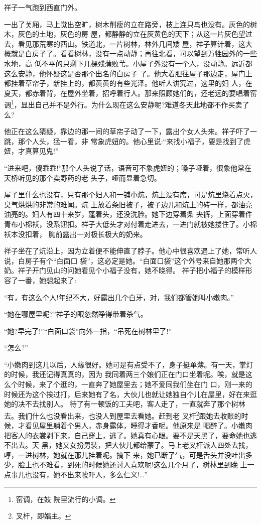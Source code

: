 \documentclass[11pt,a4paper,onecolumn]{article}
\begin{document}
祥子一气跑到西直门外。

一出了关厢，马上觉出空旷，树木削瘦的立在路旁，枝上连只鸟也没有。灰色的树木，灰色的土地，灰色的房
屋，都静静的立在灰黄色的天下；从这一片灰色望过去，看见那荒寒的西山。铁道北，一片树林，林外几间矮
屋，祥子算计着，这大概就是白房子了。看看树林，没有一点动静；再往北看，可以望到万牲园外的一些水地，高
低不平的只剩下几棵残蒲败苇。小屋子外没有一个人，没动静。远近都这么安静，他怀疑这是否那个出名的白房子
了。他大着胆往屋子那边走，屋门上都挂着草帘子，新挂上的，都黄黄的有些光泽。他听人讲究过，这里的妇
人，在夏天，都赤着背，在屋外坐着，招呼着行人。那来照顾她们的，还老远的要唱着窑调\footnote{窑调，在妓
  院里流行的小调。}，显出自己并不是外行。为什么现在这么安静呢?难道冬天此地都不作买卖了么?

他正在这么猜疑，靠边的那一间的草帘子动了一下，露出个女人头来。祥子吓了一跳，那个人头，猛一看，非
常象虎妞的。他心里说:``来找小福子，要是找到了虎妞，才真算见鬼!''

``进来吧，傻乖乖!''那个人头说了话，语音可不象虎妞的；嗓子哑着，很象他常在天桥听见的那个卖野药的老
头子，哑而显着急切。

屋子里什么也没有，只有那个妇人和一铺小炕，炕上没有席，可是炕里烧着点火，臭气烘烘的非常的难闻。炕
上放着条旧被子，被子边儿和炕上的砖一样，都油亮油亮的。妇人有四十来岁，蓬着头，还没洗脸。她下边穿着条
夹裤，上面穿着件青布小棉袄，没系钮扣。祥子大低头才对付着走进去，一进门就被她搂住了。小棉袄本没扣着，
胸前露出一对极长极大的奶来。

祥子坐在了炕沿上，因为立着便不能伸直了脖子。他心中很喜欢遇上了她，常听人说，白房子有个``白面口
袋''，这必定是她。``白面口袋''这个外号来自她那两个大奶。祥子开门见山的问她看见个小福子没有，她不晓得。
祥子把小福子的模样形容了一番，她想起来了:

``有，有这么个人!年纪不大，好露出几个白牙，对，我们都管她叫小嫩肉。''

``她在哪屋里呢?''祥子的眼忽然睁得带着杀气。

``她?早完了!''``白面口袋''向外一指，``吊死在树林里了!''

``怎么?''

``小嫩肉到这儿以后，人缘很好。她可是有点受不了，身子挺单薄。有一天，掌灯的时候，我还记得真真的，因为
我同着两三个娘们正在门口坐着呢。唉，就是这么个时候，来了个逛的，一直奔了她屋里去；她不爱同我们坐在门
口，刚一来的时候还为这个挨过打，后来她有了名，大伙儿也就让她独自个儿在屋里，好在来逛她的决不去找别人。
待了有一顿饭的工夫吧，客人走了，一直就奔了那个树林去。我们什么也没看出来，也没人到屋里去看她。赶到老
叉杆\footnote{叉杆，即娼主。}跟她去收账的时候，才看见屋里躺着个男人，赤身露体，睡得才香呢。他原来是
喝醉了。小嫩肉把客人的衣裳剥下来，自己穿上，逃了。她真有心眼。要不是天黑了，要命她也逃不出去。天
黑，她又女扮男装，把大伙儿都给蒙了。马上老叉杆派人四处去找，哼，一进树林，她就在那儿挂着呢。摘下
来，她已断了气，可是舌头并没吐出多少，脸上也不难看，到死的时候她还讨人喜欢呢!这么几个月了，树林里到晚
上一点事儿也没有，她不出来唬吓人，多么仁义!\ldots ''
\end{document}
